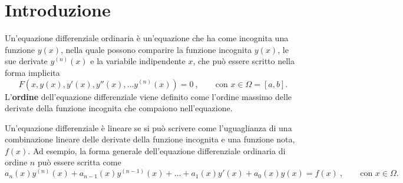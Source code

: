
\chapter{Introduzione}
\begin{definition} Un'equazione differenziale ordinaria è un'equazione che ha come incognita una funzione $y(x)$, nella quale possono comparire la funzione incognita $y(x)$, le sue derivate $y^{(n)}(x)$ e la variabile indipendente $x$, che può essere scritto nella forma implicita
\begin{equation}\label{ode:def}
  F\left(x,y(x),y'(x), y''(x), \dots y^{(n)}(x) \right) = 0 \ , \qquad \text{con $x \in \Omega = [a,b]$}.
\end{equation}
L'\textbf{ordine} dell'equazione differenziale viene definito come l'ordine massimo delle derivate della funzione incognita che compaiono nell'equazione.
\end{definition}

\begin{definition} Un'equazione differenziale è lineare se si può scrivere come l'uguaglianza di una combinazione lineare delle derivate della funzione incognita e una funzione nota, $f(x)$. Ad esempio, la forma generale dell'equazione differenziale ordinaria di ordine $n$ può essere scritta come
\begin{equation}
    a_n(x) y^{(n)}(x) + a_{n-1}(x) y^{(n-1)}(x) + \dots + a_1(x) y'(x) + a_0(x) y(x) = f(x) \ , \qquad \text{con $x \in \Omega$}.
\end{equation}
\end{definition}

